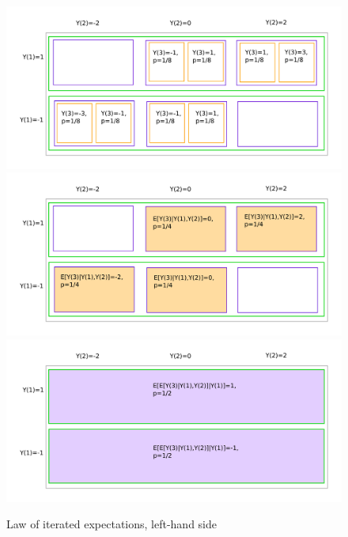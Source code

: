 \documentclass[11pt,reqno,openany]{amsbook}
\theoremstyle{plain}
\theoremstyle{definition}
\begin{document}
\begin{figure}
\includegraphics[width=\textwidth]{iter_expect/lie1.pdf}\\
\includegraphics[width=\textwidth]{iter_expect/lie2.pdf}\\
\includegraphics[width=\textwidth]{iter_expect/lie3.pdf}
\caption{Law of iterated expectations, left-hand side}\label{fig:lie-lhs}
\end{figure}
\end{document}
